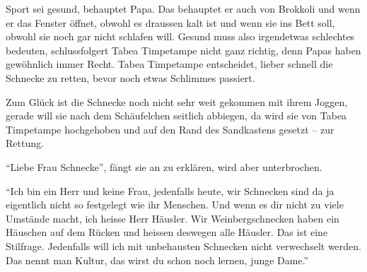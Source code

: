 Sport sei gesund, behauptet Papa. Das behauptet er auch von Brokkoli und wenn er das Fenster öffnet, obwohl es draussen kalt ist und wenn sie ins Bett soll, obwohl sie noch gar nicht schlafen will. Gesund muss also irgendetwas schlechtes bedeuten, schlussfolgert Tabea Timpetampe nicht ganz richtig, denn Papas haben gewöhnlich immer Recht. Tabea Timpetampe entscheidet, lieber schnell die Schnecke zu retten, bevor noch etwas Schlimmes passiert.

Zum Glück ist die Schnecke noch nicht sehr weit gekommen mit ihrem Joggen, gerade will sie nach dem Schäufelchen seitlich abbiegen, da wird sie von Tabea Timpetampe hochgehoben und auf den Rand des Sandkastens gesetzt -- zur Rettung. 

\enquote{Liebe Frau Schnecke}, fängt sie an zu erklären, wird aber unterbrochen.

\enquote{Ich bin ein Herr und keine Frau, jedenfalls heute, wir Schnecken sind da ja eigentlich nicht so festgelegt wie ihr Menschen. Und wenn es dir nicht zu viele Umstände macht, ich heisse Herr Häusler. Wir Weinbergschnecken haben ein Häuschen auf dem Rücken und heissen deswegen alle Häusler. Das ist eine Stilfrage. Jedenfalls will ich mit unbehausten Schnecken nicht verwechselt werden. Das nennt man Kultur, das wirst du schon noch lernen, junge Dame.}


